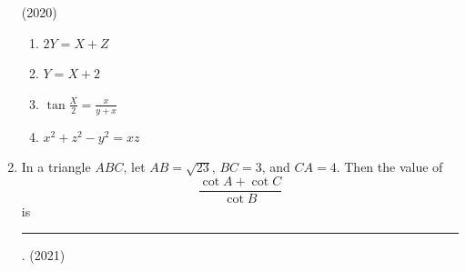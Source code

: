 \begin{enumerate}[label=\thesubsection.\arabic*,ref=\thesubsection.\theenumi]
		\hfill (2020)
	\begin{multicols}{2}
    \begin{enumerate}
        \item  $2Y = X + Z$
        \item  $Y = X + 2$
	\item  $\tan\frac{X}{2} = \frac{x}{y + x}$        
	\item  $x^2 + z^2 - y^2 = xz$
    \end{enumerate}
\end{multicols}
    \item In a triangle $ABC$, let $AB = \sqrt{23}$, $BC = 3$, and $CA = 4$. Then the value of  
    \[
    \frac{\cot A + \cot C}{\cot B}
    \]  
    is \rule{1cm}{0.1pt}.
%
    \hfill (2021)
\end{enumerate}
